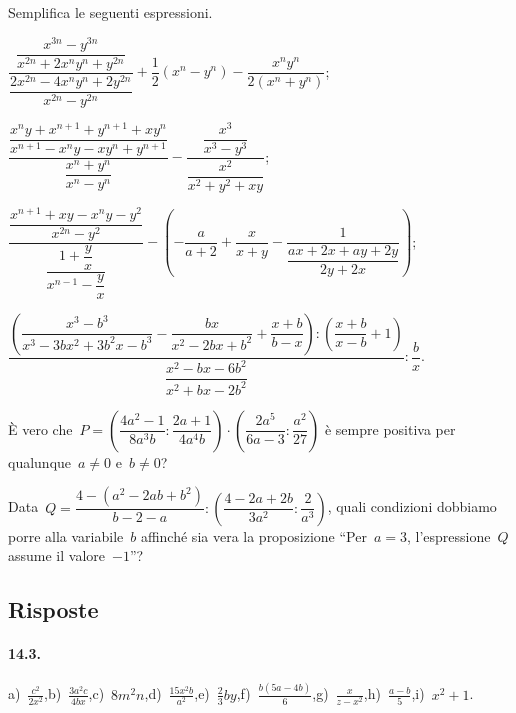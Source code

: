 \begin{esercizio}[\Ast]
\label{ese:14.65}
Semplifica le seguenti espressioni.
\begin{enumeratea}
 \item $\dfrac{\dfrac{x^{3n}-y^{3n}}{x^{2n}+2x^{n}y^{n}+y^{2n}}}{\dfrac{2x^{2n}-4x^{n}y^{n}+2y^{2n}}{x^{2n}-y^{2n}}}+\dfrac{1}{2}\left(x^{n}-y^{n}\right)-\dfrac{x^{n}y^{n}}{2\left(x^{n}+y^{n}\right)}$;
 \item $\dfrac{\dfrac{x^{n}y+x^{n+1}+y^{n+1}+xy^{n}}{x^{n+1}-x^{n}y-xy^{n}+y^{n+1}}}{\dfrac{x^{n}+y^{n}}{x^{n}-y^{n}}}-\dfrac{\dfrac{x^{3}}{x^{3}-y^{3}}}{\dfrac{x^{2}}{x^{2}+y^{2}+xy}}$;
 \item $\dfrac{\dfrac{x^{n+1}+xy-x^{n}y-y^{2}}{x^{2n}-y^{2}}}{\dfrac{1+\dfrac{y}{x}}{x^{n-1}-\dfrac{y}{x}}}-\left(-{\dfrac{a}{a+2}}+\dfrac{x}{x+y}-\dfrac{1}{\dfrac{ax+2x+ay+2y}{2y+2x}}\right)$;
 \item $\dfrac{\left(\dfrac{x^{3}-b^{3}}{x^{3}-3bx^{2}+3b^{2}x-b^{3}}-\dfrac{bx}{x^{2}-2bx+b^{2}}+\dfrac{x+b}{b-x}\right):\left(\dfrac{x+b}{x-b}+1\right)}{\dfrac{x^{2}-bx-6b^{2}}{x^{2}+bx-2b^{2}}}:\dfrac{b}{x}$.
\end{enumeratea}
\end{esercizio}

\begin{esercizio}[\Ast]
\label{ese:14.66}
È vero che~$P=\left(\dfrac{4a^{2}-1}{8a^{3}b}:\dfrac{2a+1}{4a^{4}b}\right)\cdot \left(\dfrac{2a^{5}}{6a-3}:\dfrac{a^{2}}{27}\right)$
è sempre positiva per qualunque~$a{\neq}0$ e~$b{\neq}0$?
\end{esercizio}

\begin{esercizio}[\Ast]
\label{ese:14.67}
Data~$Q=\dfrac{4-\left(a^{2}-2ab+b^{2}\right)}{b-2-a}:\left(\dfrac{4-2a+2b}{3a^{2}}:\dfrac{2}{a^{3}}\right)$,
quali condizioni dobbiamo porre alla variabile~$b$ affinché sia vera la proposizione ``Per~$a = 3$, l’espressione~$Q$ assume il valore~$-1$''?
\end{esercizio}

\subsection{Risposte}

\paragraph{14.3.}
a)~$\frac{c^{2}}{2x^{2}}$,\quad b)~$\frac{3a^{2}c}{4bx}$,\quad c)~$8m^{2}n$,\quad d)~$\frac{15x^{2}b}{a^{2}}$,\quad e)~$\frac{2}{3}by$,\quad f)~$\frac{b(5a-4b)}{6}$,\quad g)~$\frac{x}{z-x^{2}}$,\quad h)~$\frac{a-b}{5}$,\quad i)~$x^{2}+1$.

